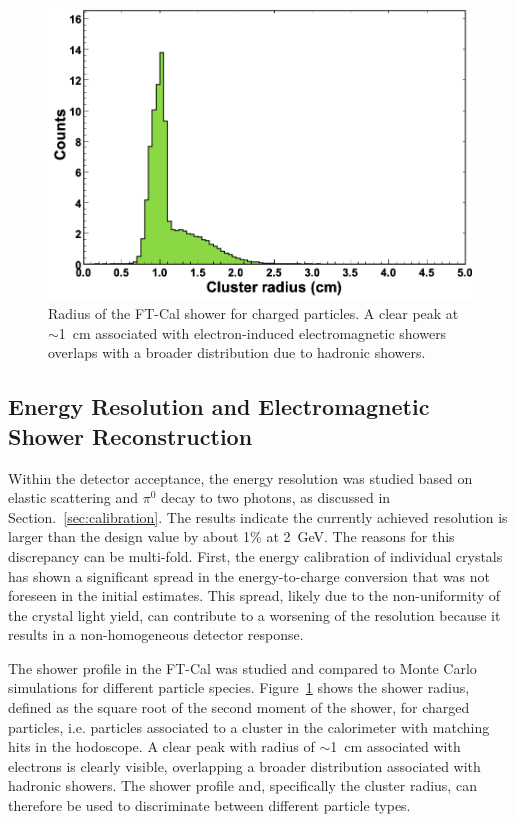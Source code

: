 \begin{figure}[h]
\includegraphics[height=0.65\columnwidth]{fig/ft_shower.png}
\caption{Radius of the FT-Cal shower for charged particles. A clear peak at $\sim$1~cm associated with
  electron-induced electromagnetic showers overlaps with a broader distribution due to hadronic showers.}
\label{fig:ft_shower}
\end{figure}

\subsection{Energy Resolution and Electromagnetic Shower Reconstruction}

Within the detector acceptance, the energy resolution was studied based on elastic scattering and $\pi^0$ decay to
two photons, as discussed in Section.~\ref{sec:calibration}. The results indicate the currently achieved resolution is
larger than the design value by about 1\% at 2~GeV. The reasons for this discrepancy can be multi-fold. First, the
energy calibration of individual crystals has shown a significant spread in the energy-to-charge conversion that was
not foreseen in the initial estimates. This spread, likely due to the non-uniformity of the crystal light yield, can contribute to a worsening
of the resolution because it results in a non-homogeneous detector response. 

The shower profile in the FT-Cal was studied and compared to Monte Carlo simulations for different particle
species. Figure~\ref{fig:ft_shower} shows the shower radius, defined as the square root of the second moment of
the shower, for charged particles, i.e. particles associated to a cluster in the calorimeter with matching hits in the
hodoscope. A clear peak with radius of $\sim$1~cm associated with electrons is clearly visible, overlapping a
broader distribution associated with hadronic showers. The shower profile and, specifically the cluster radius, can
therefore be used to discriminate between different particle types.

